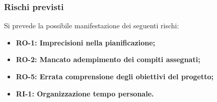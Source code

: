 \documentclass[a4paper,12pt]{article}
\begin{document}
        \subsubsection{Rischi previsti}{
            Si prevede la possibile manifestazione dei seguenti rischi:
            \begin{itemize}
                \item \textbf{RO-1: Imprecisioni nella pianificazione;}
                \item \textbf{RO-2: Mancato adempimento dei compiti assegnati;}
                \item \textbf{RO-5: Errata comprensione degli obiettivi del progetto;}
                \item \textbf{RI-1: Organizzazione tempo personale.}
            \end{itemize}
        }

    
\end{document}
